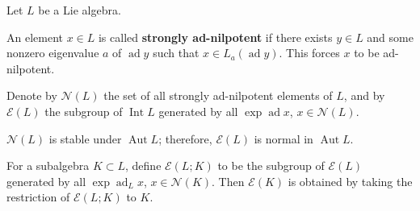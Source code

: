 Let $L$ be a Lie algebra.

An element $x \in L$ is called \textbf{strongly ad-nilpotent} if there exists $y \in L$ and some nonzero eigenvalue $a$ of $\operatorname{ad} y$ such that $x \in L_a(\operatorname{ad} y)$. This forces $x$ to be ad-nilpotent.

Denote by $\mathcal{N}(L)$ the set of all strongly ad-nilpotent elements of $L$, and by $\mathcal{E}(L)$ the subgroup of $\operatorname{Int} L$ generated by all $\exp \operatorname{ad} x$, $x \in \mathcal{N}(L)$. 

$\mathcal{N}(L)$ is stable under $\operatorname{Aut} L$; therefore, $\mathcal{E}(L)$ is normal in $\operatorname{Aut} L$.

For a subalgebra $K \subset L$, define $\mathcal{E}(L; K)$ to be the subgroup of $\mathcal{E}(L)$ generated by all $\exp \operatorname{ad}_L x$, $x \in \mathcal{N}(K)$. Then $\mathcal{E}(K)$ is obtained by taking the restriction of $\mathcal{E}(L; K)$ to $K$.
